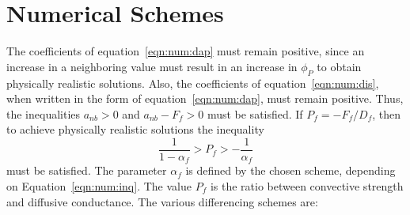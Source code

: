 \section{Numerical Schemes}

The coefficients of equation~\eqref{eqn:num:dap} must remain positive,
since an increase in a neighboring value must result in an increase
in $\phi_P$ to obtain physically realistic solutions. Also, the
coefficients of equation~\eqref{eqn:num:dis}, when written in the form
of equation~\eqref{eqn:num:dap}, must remain positive. Thus, the
inequalities $a_{nb} > 0$ and $a_{nb} - F_f>0$ must be satisfied.  If
$P_f = -F_f / D_f$, then to achieve physically realistic solutions the
inequality
\begin{equation}
\frac{1}{1-\alpha_f} > P_f > -\frac{1}{\alpha_f}
\label{eqn:num:inq}
\end{equation}
must be satisfied.
The parameter $\alpha_f$ is defined by the chosen scheme, depending
on Equation~\eqref{eqn:num:inq}. The value $P_f$ is the ratio between
convective strength and diffusive conductance. The various
differencing schemes are:
